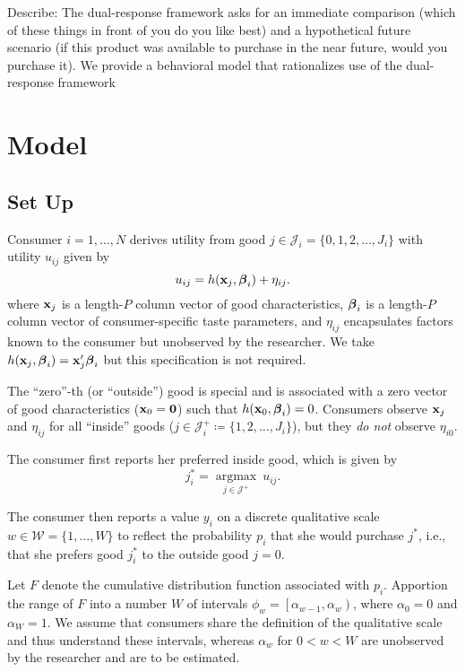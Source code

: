 \documentclass[
  letterpaper,
  DIV=11,
  numbers=noendperiod]{scrartcl}
\begin{document}
Describe: The dual-response framework asks for an immediate comparison
(which of these things in front of you do you like best) and a
hypothetical future scenario (if this product was available to purchase
in the near future, would you purchase it). We provide a behavioral
model that rationalizes use of the dual-response framework

\section{Model}\label{sec-model}

\subsection{Set Up}\label{set-up}

Consumer \(i=1,\ldots,N\) derives utility from good
\(j \in \mathcal{J}_i =  \lbrace 0,1,2,\ldots,J_i \rbrace\) with utility
\(u_{ij}\) given by \[
u_{ij} = h(\mathbf{x}_j, \boldsymbol{\beta}_i) + \eta_{ij}.
\] where \(\mathbf{x}_j\) is a length-\(P\) column vector of good
characteristics, \(\boldsymbol{\beta}_i\) is a length-\(P\) column vector of
consumer-specific taste parameters, and \(\eta_{ij}\) encapsulates
factors known to the consumer but unobserved by the researcher. We take
\(h(\mathbf{x}_j, \boldsymbol{\beta}_i) = \mathbf{x}_j'\boldsymbol{\beta}_i\) but this specification is not
required.

The ``zero''-th (or ``outside'') good is special and is associated with
a zero vector of good characteristics (\(\mathbf{x}_0 = \mathbf{0}\)) such that
\(h(\mathbf{x}_0, \boldsymbol{\beta}_i)=0\). Consumers observe \(\mathbf{x}_j\) and \(\eta_{ij}\)
for all ``inside'' goods
(\(j \in \mathcal{J}^{+}_i \coloneqq \lbrace 1,2,\ldots,J_i \rbrace\)),
but they \emph{do not} observe \(\eta_{i0}\).

The consumer first reports her preferred inside good, which is given by
\[
j^*_i = \underset{j \in \mathcal{J}^+}{\operatorname{arg max}} \ u_{ij}.
\]

The consumer then reports a value \(y_i\) on a discrete qualitative
scale \(w \in \mathcal{W} = \lbrace 1, \ldots, W \rbrace\) to reflect
the probability \(p_i\) that she would purchase \(j^*\), i.e., that she
prefers good \(j^*_i\) to the outside good \(j=0\).

Let \(F\) denote the cumulative distribution function associated with
\(p_i\). Apportion the range of \(F\) into a number \(W\) of intervals
\(\phi_w = \left[ \alpha_{w-1}, \alpha_w \right)\), where
\(\alpha_0 = 0\) and \(\alpha_W = 1\). We assume that consumers share
the definition of the qualitative scale and thus understand these
intervals, whereas \(\alpha_w\) for \(0<w<W\) are unobserved by the
researcher and are to be estimated.
\end{document}
